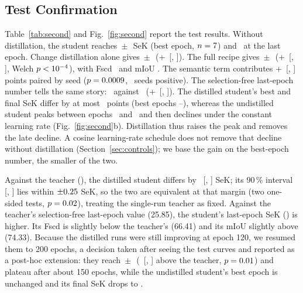 \documentclass[journal]{IEEEtran}
\begin{document}
\subsection{Test Confirmation}
\label{sec:second-test}
Table~\ref{tab:second} and Fig.~\ref{fig:second} report the test results. Without
distillation, the student reaches \SecBaseSek\,$\pm$\,\SecBaseSekSd\ SeK (best epoch,
$n=7$) and \SecBaseSekFinal\ at the last epoch. Change distillation alone gives
\SecChgSek\,$\pm$\,\SecChgSekSd\ (+\SecChgGain\ [\SecChgGainLo, \SecChgGainHi]). The full recipe
gives \SecFullSek\,$\pm$\,\SecFullSekSd\ (+\SecFullGain\ [\SecFullGainLo, \SecFullGainHi],
Welch $p<10^{-4}$), with Fscd \SecFullFscd\ and mIoU \SecFullMiou. The semantic term
contributes +\SemInc\ [\SemIncLo, \SemIncHi] points paired by seed ($p=0.0009$, \SemIncPos\
seeds positive). The selection-free last-epoch number tells the same story: \SecFullSekFinal\
against \SecBaseSekFinal\ (+\SecFullGainFinal\ [\SecFullGainFinalLo, \SecFullGainFinalHi]).
The
distilled student's best and final SeK differ by at most \SecFullMaxFinalGap\ points (best epochs
\SecFullBestEpMin--\SecFullBestEpMax), whereas the undistilled student peaks between epochs
\SecBaseBestEpMin\ and \SecBaseBestEpMax\ and then declines under the constant learning rate
(Fig.~\ref{fig:second}b). Distillation thus raises the peak and removes the late decline. A cosine
learning-rate schedule does not remove that decline without distillation
(Section~\ref{sec:controls}); we base the gain on the best-epoch number, the smaller of the two.

Against the teacher (\TeacherVitgSek), the distilled student differs by \SecFullVsT\
[\SecFullVsTLo, \SecFullVsTHi] SeK; its 90\,\% interval [\TostLo, \TostHi] lies within
$\pm0.25$ SeK, so the two are equivalent at that margin (two one-sided tests, $p=0.02$),
treating the single-run teacher as fixed. Against the teacher's selection-free last-epoch value
(25.85), the student's last-epoch SeK (\SecFullSekFinal) is higher.
Its Fscd is slightly below the teacher's (66.41) and its mIoU slightly above (74.33).
Because the distilled runs were still improving at epoch 120, we resumed them to 200 epochs,
a decision taken after seeing the test curves and reported as a post-hoc extension: they reach
\SecFullTwoHundredSek\,$\pm$\,\SecFullTwoHundredSekSd\ (\SecFullTwoHundredVsT\
[\SecFullTwoHundredVsTLo, \SecFullTwoHundredVsTHi] above the teacher, $p=0.01$)
and plateau after about 150 epochs, while the undistilled student's best epoch is unchanged and
its final SeK drops to \SecBaseSekFinalTwoHundred.
\end{document}
